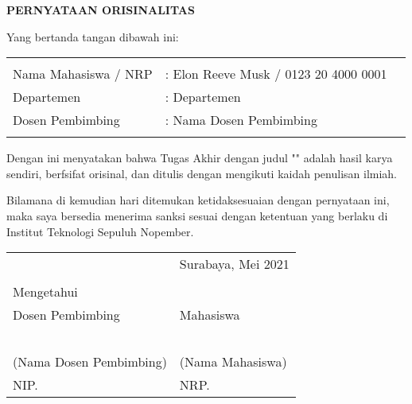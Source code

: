 \begin{center}
  \large
  \textbf{PERNYATAAN ORISINALITAS}
\end{center}

\thispagestyle{empty}

\vspace{2ex}


\noindent Yang bertanda tangan dibawah ini:

\noindent\begin{tabularx}{\textwidth}{X X l}
  & \\
  Nama Mahasiswa / NRP &: Elon Reeve Musk / 0123 20 4000 0001 \\
  Departemen &: Departemen \\
  Dosen Pembimbing &: Nama Dosen Pembimbing \\
  & \\
\end{tabularx}

Dengan ini menyatakan bahwa Tugas Akhir dengan judul "" adalah hasil karya sendiri, berfsifat orisinal, dan ditulis dengan mengikuti kaidah penulisan ilmiah.

Bilamana di kemudian hari ditemukan ketidaksesuaian dengan pernyataan ini, maka saya bersedia menerima sanksi sesuai dengan ketentuan yang berlaku di Institut Teknologi Sepuluh Nopember.

\vspace{8ex}

\noindent\begin{tabularx}{\textwidth}{X l}
  & Surabaya, Mei 2021\\
  & \\
  Mengetahui & \\
  Dosen Pembimbing & Mahasiswa\\
  & \\
  & \\
  & \\
  & \\
  & \\
  (Nama Dosen Pembimbing) & (Nama Mahasiswa) \\
  NIP. & NRP. \\
\end{tabularx}